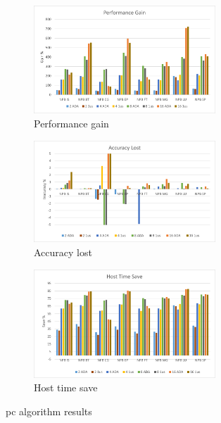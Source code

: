 \begin{figure}[H]
\centering
\begin{subfigure}{\textwidth}
    \centering
    \includegraphics[width=0.75\textwidth]{Images/Performance_ADA.png}
    \caption{ Performance gain}
    \label{fig:Performance_ADAINCPC}
\end{subfigure}
\begin{subfigure}{\textwidth}
    \centering
    \includegraphics[width=0.75\textwidth]{Images/Accuracy_ADA.png}
    \caption{ Accuracy lost}
    \label{fig:Accuracy_ADAINCPC}
\end{subfigure}
\begin{subfigure}{\textwidth}
    \centering
    \includegraphics[width=0.75\textwidth]{Images/Host_ADA.png}
    \caption{ Host time save}
    \label{fig:Host_ADAINCPC}
\end{subfigure}
        
\caption{\gls{pc} algorithm results}
\label{fig:results_ADAINCPC}
\end{figure}

